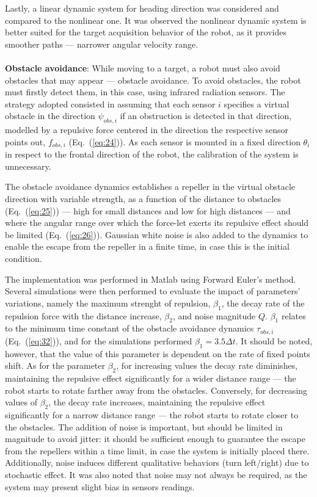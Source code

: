 Lastly, a linear dynamic system for heading direction
was considered and compared to the nonlinear one. 
It was observed the nonlinear
dynamic system is better suited for the target acquisition behavior of the
robot, as it provides smoother paths --- narrower angular velocity range.
\\\\
\textbf{Obstacle avoidance}: While moving to a target, a robot must also avoid obstacles that may appear ---
obstacle avoidance. To avoid obstacles, the robot must firstly detect them, in
this case, using infrared radiation sensors. The strategy adopted consisted in
assuming that each sensor $i$ specifies a virtual obstacle in the direction
$\psi_{obs,i}$ if an obstruction is detected in that direction, modelled by a
repulsive force centered in the direction the respective sensor points out,
$f_{obs,i}$ (Eq.~(\ref{eq:24})). As each sensor is mounted in a fixed direction
$\theta_i$ in respect to the frontal direction of the robot, the calibration of
the system is unnecessary. 

The obstacle avoidance dynamics establishes a
repeller in the virtual obstacle direction with variable strength, as a function
of the distance to obstacles (Eq.~(\ref{eq:25})) --- high for small distances
and low for high distances --- and where the angular range over which the
force-let exerts its repulsive effect should be limited
(Eq.~(\ref{eq:26})). Gaussian white noise is also added to the dynamics to
enable the escape from the repeller in a finite time, in case this is the
initial condition. 

The implementation was performed in Matlab using Forward
Euler's method. Several simulations were then performed to evaluate the impact
of parameters' variations, namely the maximum strenght of repulsion,
$\beta_1$, the decay rate of the repulsion force with the distance increase,
$\beta_2$, and noise magnitude $Q$. $\beta_1$ relates to the minimum time
constant of the obstacle avoidance dynamics $\tau_{obs,i}$ (Eq.~(\ref{eq:32})),
and for the simulations performed $\beta_1 = 3.5 \Delta t$. It should be noted,
however, that the value of this parameter is dependent on the rate of fixed
points shift. As for the parameter $\beta_2$, for increasing values the decay
rate diminishes, maintaining the repulsive effect significantly for
a wider distance range --- the robot starts to rotate farther away from the
obstacles. Conversely, for decreasing values of $\beta_2$, the decay rate
increases, maintaining the repulsive effect significantly for
a narrow distance range --- the robot starts to rotate closer to the
obstacles. The addition of noise is important, but should be limited in
magnitude to avoid jitter: it should be sufficient enough to guarantee the escape from the
repellers within a time limit, in case the system is initially placed
there. Additionally, noise induces different qualitative behaviors (turn
left/right) due to stochastic effect. It was also noted that noise may not
always be required, as the system may present slight bias in sensors
readings. 

